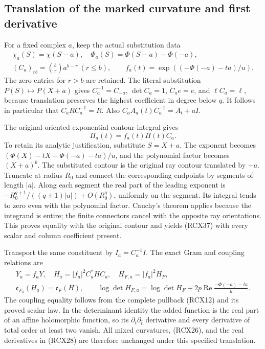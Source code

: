 \documentclass{article}
\begin{document}
\subsection{Translation of the marked curvature and first derivative}

For a fixed complex \(a\), keep the actual substitution data
\[
\begin{gathered}
 \chi_a(S)=\chi(S-a),\quad
 \Phi_a(S)=\Phi(S-a)-\Phi(-a),\\
 (C_a)_{rb}=\binom br a^{b-r}\ (r\le b),\qquad
 f_a(t)=\exp((-\Phi(-a)-ta)/u).
\end{gathered}\tag{RCX36}
\]
The zero entries for \(r>b\) are retained. The literal substitution
\(P(S)\mapsto P(X+a)\) gives
\(C_a^{-1}=C_{-a}\), \(\det C_a=1\), \(C_ae=e\), and
\(\ell C_a=\ell\), because translation preserves the highest
coefficient in degree below \(q\). It follows in particular that
\(C_aRC_a^{-1}=R\). Also
\(C_aA_a(t)C_a^{-1}=A_t+aI\).

The original oriented exponential contour integral gives
\[
 \Pi_a(t)=f_a(t)\Pi(t)C_a.
 \tag{RCX37}
\]
To retain its analytic justification, substitute \(S=X+a\).
The exponent becomes
\((\Phi(X)-tX-\Phi(-a)-ta)/u\), and the polynomial factor becomes
\((X+a)^b\). The substituted contour is the original ray contour
translated by \(-a\). Truncate at radius \(R_0\) and connect the
corresponding endpoints by segments of length \(|a|\). Along each
segment the real part of the leading exponent is
\(-R_0^{q+1}/((q+1)|u|)+O(R_0^q)\), uniformly on the segment.
Its integral tends to zero even with the polynomial factor.
Cauchy's theorem applies because the integrand is entire; the
finite connectors cancel with the opposite ray orientations.
This proves equality with the original contour and yields
(RCX37) with every scalar and column coefficient present.

Transport the same constituent by \(I_a=C_a^{-1}I\). The exact
Gram and coupling relations are
\[
\begin{gathered}
 Y_a=f_aY,\quad H_a=|f_a|^2C_a^*HC_a,\quad
 H_{F,a}=|f_a|^2H_F,\\
 \mathfrak c_{F_a}(H_a)=\mathfrak c_F(H),\qquad
 \log\det H_{F,a}
 =\log\det H_F+2p\operatorname{Re}\frac{-\Phi(-a)-ta}{u}.
\end{gathered}\tag{RCX38}
\]
The coupling equality follows from the complete pullback
(RCX12) and its proved scalar law. In the determinant identity
the added function is the real part of an affine holomorphic
function, so its \(\partial_t\partial_{\bar t}\) derivative and
every derivative of total order at least two vanish. All mixed
curvatures, (RCX26), and the real derivatives in (RCX28) are
therefore unchanged under this specified translation.
\end{document}
